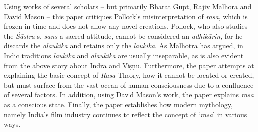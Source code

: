 Using works of several scholars -- but primarily Bharat Gupt, Rajiv Malhora and David Mason -- this paper critiques Pollock’s misinterpretation of \textsl{rasa}, which is frozen in time and does not allow any novel creations. Pollock, who also studies the \textsl{Śāstra}-s, \textsl{sans} a sacred attitude, cannot be considered an \textsl{adhikārin}, for he discards the \textsl{alaukika} and retains only the \textsl{laukika}. As Malhotra has argued, in Indic traditions \textsl{laukika} and \textsl{alaukika} are usually inseparable, as is also evident from the above story about Indra and Viṣṇu. Furthermore, the paper attempts at explaining the basic concept of \textsl{Rasa} Theory, how it cannot be located or created, but must surface from the vast ocean of human consciousness due to a confluence of several factors. In addition, using David Mason’s work, the paper explains \textsl{rasa} as a conscious state. Finally, the paper establishes how modern mythology, namely India’s film industry continues to reflect the concept of ‘\textsl{rasa}' in various ways. 

